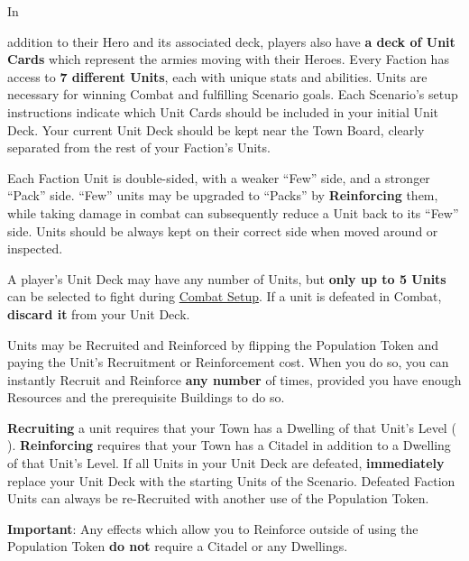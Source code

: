 
\begin{multicols*}{2}


\hypertarget{Units}{In} addition to their Hero and its associated deck, players also have \textbf{a deck of Unit Cards} which represent the armies moving with their Heroes.
Every Faction has access to \textbf{7 different Units}, each with unique stats and abilities.
Units are necessary for winning Combat and fulfilling Scenario goals.
Each Scenario's setup instructions indicate which Unit Cards should be included in your initial Unit Deck.
Your current Unit Deck should be kept near the Town Board, clearly separated from the rest of your Faction's Units.\par
Each Faction Unit is double-sided, with a weaker “Few” side, and a stronger “Pack” side.
“Few” units may be upgraded to “Packs” by \textbf{Reinforcing} them, while taking damage in combat can subsequently reduce a Unit back to its “Few” side.
Units should be always kept on their correct side when moved around or inspected.\par
A player's Unit Deck may have any number of Units, but \textbf{only up to 5 Units} can be selected to fight during \hyperlink{Combatsetup}{Combat Setup}.
If a unit is defeated in Combat, \textbf{discard it} from your Unit Deck.\par
Units may be Recruited and Reinforced by flipping the Population Token and paying the Unit's Recruitment  or Reinforcement  cost.
When you do so, you can instantly Recruit and Reinforce \textbf{any number} of times, provided you have enough Resources and the prerequisite Buildings to do so.\par

\textbf{Recruiting} a unit requires that your Town has a Dwelling of that Unit's Level ( ).
\textbf{Reinforcing} requires that your Town has a Citadel in addition to a Dwelling of that Unit's Level.
If all Units in your Unit Deck are defeated, \textbf{immediately} replace your Unit Deck with the starting Units of the Scenario. Defeated Faction Units can always be re-Recruited with another use of the Population Token.\par

\textbf{Important}: Any effects which allow you to Reinforce outside of using the Population Token \textbf{do not} require a Citadel or any Dwellings.


\end{multicols*}
